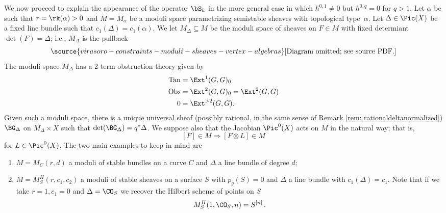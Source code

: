 We now proceed to explain the appearance of the operator $\bS_k$ in the more general case in which $h^{0, 1}\neq 0$ but $h^{0, q}=0$ for $q>1$. Let $\alpha$ be such that $r=\rk(\alpha)>0$ and $M=M_\alpha$ be a moduli space parametrizing semistable sheaves with topological type~$\alpha$. Let $\Delta\in \Pic(X)$ be a fixed line bundle  such that $c_1(\Delta)=c_1(\alpha)$. We let $M_\Delta\subseteq M$ be the moduli space of sheaves on $F\in M$ with fixed determiant $\det(F)=\Delta$; i.e., $M_\Delta$ is the pullback
\begin{equation}\label{eq: cartesianpic}
\source{virasoro-constraints-moduli-sheaves-vertex-algebras}
\text{[Diagram omitted; see source PDF.]}
\end{equation}
The moduli space $M_\Delta$ has a 2-term obstruction theory given by
\begin{align*}
\textup{Tan}&=\Ext^1(G,G)_0\\
\textup{Obs}&=\Ext^2(G,G)_0=\Ext^2(G, G)\\
0&=\Ext^{>2}(G,G).
\end{align*}
Given such a moduli space, there is a unique universal sheaf (possibly rational, in the same sense of Remark \ref{rem: rationaldeltanormalized}) $\BG_\Delta$ on $M_\Delta\times X$ such that $\det(\BG_\Delta)=q^\ast \Delta$.
We suppose also that the Jacobian $\Pic^0(X)$ acts on $M$ in the natural way; that is,
\[[F]\in M\Rightarrow [F\otimes L]\in M\]
for $L\in \Pic^0(X)$. The two main examples to keep in mind are
\begin{enumerate}
\item $M=M_C(r, d)$ a moduli of stable bundles on a curve $C$ and $\Delta$ a line bundle of degree $d$;
\item $M=M_S^H(r, c_1,c_2)$ a moduli of stable sheaves on a surface $S$ with $p_g(S)=0$ and $\Delta$ a line bundle with $c_1(\Delta)=c_1$. Note that if we take $r=1, c_1=0$ and $\Delta=\CO_S$ we recover the Hilbert scheme of points on $S$
\[M_S^H(1, \CO_S, n)= S^{[n]}\,.\]
\end{enumerate}



